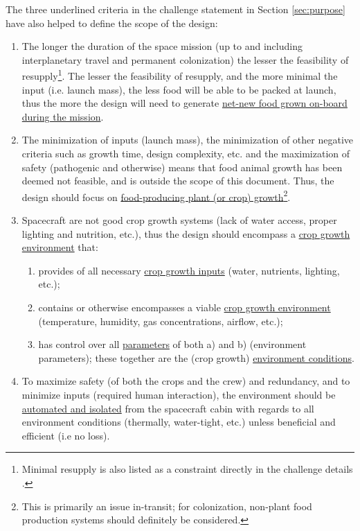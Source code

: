 \documentclass{report}
\begin{document}
The three underlined criteria in the challenge statement in Section \ref{sec:purpose} have also helped to define the scope of the design:
\begin{enumerate}[label=SC\arabic*., ref=SC\arabic*]
\item \label{sc:1} The longer the duration of the space mission (up to and including interplanetary travel and permanent colonization) the lesser the feasibility of
    resupply\footnote{Minimal resupply is also listed as a constraint directly in the challenge details \cite{applicantguide,dsfc-phase2}.}.
    The lesser the feasibility of resupply, and the more minimal the input (i.e. launch mass), the less food will be able to be packed at launch, thus the more the design will need to generate \uline{net-new food grown on-board during the mission}.
\item \label{sc:2} The minimization of inputs (launch mass), the minimization of other negative criteria such as growth time, design complexity, etc. and the maximization of safety (pathogenic and otherwise) means that food animal growth has been deemed not feasible, and is outside the scope of this document. Thus, the design should focus on \uline{food-producing plant (or crop)
    growth}\footnote{This is primarily an issue in-transit; for colonization, non-plant food production systems should definitely be considered.}.
\item \label{sc:3} Spacecraft are not good crop growth systems (lack of water access, proper lighting and nutrition, etc.), thus the design should encompass a \uline{crop growth environment} that:
    \begin{enumerate}[label=SC3\alph*., ref=SC3\alph*]
        \item \label{sc:3a} provides of all necessary \uline{crop growth inputs} (water, nutrients, lighting, etc.);
        \item \label{sc:3b} contains or otherwise encompasses a viable \uline{crop growth environment} (temperature, humidity, gas concentrations, airflow, etc.);
        \item \label{sc:3c} has control over all \uline{parameters} of both a) and b) (environment parameters); these together are the (crop growth) \uline{environment conditions}.
    \end{enumerate}
\item \label{sc:4} To maximize safety (of both the crops and the crew) and redundancy, and to minimize inputs (required human interaction), the environment should be \uline{automated and isolated} from the spacecraft cabin with regards to all environment conditions (thermally, water-tight, etc.) unless beneficial and efficient (i.e no loss).

\end{enumerate}
\end{document}
